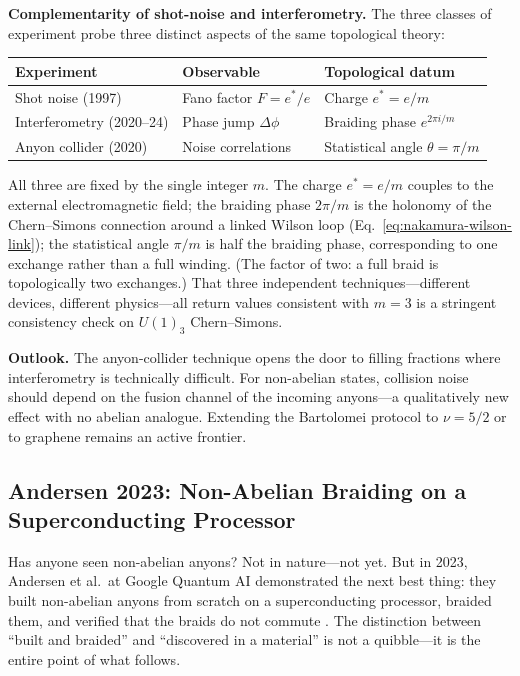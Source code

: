 \medskip
\noindent\textbf{Complementarity of shot-noise and interferometry.}
The three classes of experiment probe three distinct aspects of the same topological theory:
\begin{center}
\renewcommand{\arraystretch}{1.3}
\begin{tabular}{lll}
  \textbf{Experiment} & \textbf{Observable} & \textbf{Topological datum} \\
  \hline
  Shot noise (1997) & Fano factor $F = e^{*}/e$ & Charge $e^{*} = e/m$ \\
  Interferometry (2020--24) & Phase jump $\Delta\phi$ & Braiding phase $e^{2\pi i/m}$ \\
  Anyon collider (2020) & Noise correlations & Statistical angle $\theta = \pi/m$
\end{tabular}
\end{center}
All three are fixed by the single integer $m$.  The charge $e^{*} = e/m$ couples to the external electromagnetic field; the braiding phase $2\pi/m$ is the holonomy of the Chern--Simons connection around a linked Wilson loop (Eq.~\ref{eq:nakamura-wilson-link}); the statistical angle $\pi/m$ is half the braiding phase, corresponding to one exchange rather than a full winding.  (The factor of two: a full braid is topologically two exchanges.)  That three independent techniques---different devices, different physics---all return values consistent with $m = 3$ is a stringent consistency check on $U(1)_3$ Chern--Simons.

\medskip
\noindent\textbf{Outlook.}
The anyon-collider technique opens the door to filling fractions where interferometry is technically difficult.  For non-abelian states, collision noise should depend on the fusion channel of the incoming anyons---a qualitatively new effect with no abelian analogue.  Extending the Bartolomei protocol to $\nu = 5/2$ or to graphene remains an active frontier.

\subsection{Andersen 2023: Non-Abelian Braiding on a Superconducting Processor}
\label{subsec:andersen-2023}

Has anyone seen non-abelian anyons?  Not in nature---not yet.  But in 2023, Andersen et al.\ at Google Quantum AI demonstrated the next best thing: they built non-abelian anyons from scratch on a superconducting processor, braided them, and verified that the braids do not commute \cite{Andersen2023NonAbelianBraiding}.  The distinction between ``built and braided'' and ``discovered in a material'' is not a quibble---it is the entire point of what follows.

